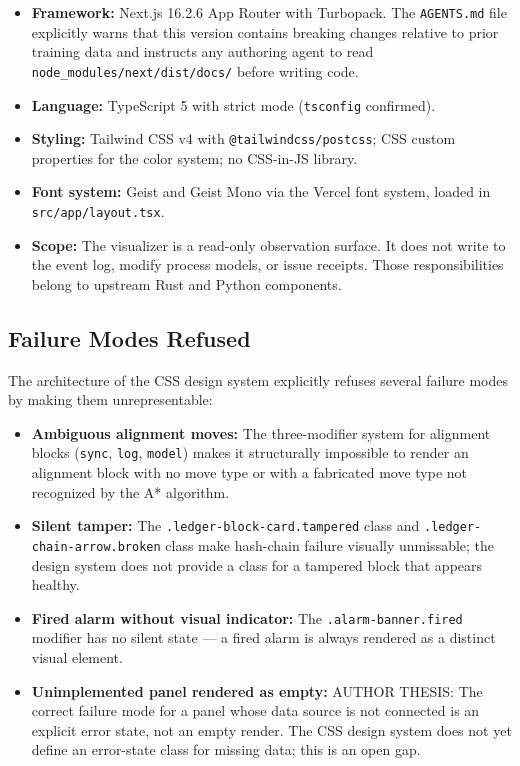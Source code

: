 \begin{itemize}
  \item \textbf{Framework:} Next.js 16.2.6 App Router with Turbopack. The \texttt{AGENTS.md}
        file explicitly warns that this version contains breaking changes relative to prior
        training data and instructs any authoring agent to read
        \texttt{node\_modules/next/dist/docs/} before writing code.
  \item \textbf{Language:} TypeScript 5 with strict mode (\texttt{tsconfig} confirmed).
  \item \textbf{Styling:} Tailwind CSS v4 with \texttt{@tailwindcss/postcss}; CSS custom
        properties for the color system; no CSS-in-JS library.
  \item \textbf{Font system:} Geist and Geist Mono via the Vercel font system, loaded in
        \texttt{src/app/layout.tsx}.
  \item \textbf{Scope:} The visualizer is a read-only observation surface. It does not write
        to the event log, modify process models, or issue receipts. Those responsibilities
        belong to upstream Rust and Python components.
\end{itemize}

\subsection{Failure Modes Refused}
\label{sec:experiments-visualizer-nextjs-arch-failures}

The architecture of the CSS design system explicitly refuses several failure modes by making
them unrepresentable:

\begin{itemize}
  \item \textbf{Ambiguous alignment moves:} The three-modifier system for alignment blocks
        (\texttt{sync}, \texttt{log}, \texttt{model}) makes it structurally impossible to
        render an alignment block with no move type or with a fabricated move type not
        recognized by the A{*} algorithm.
  \item \textbf{Silent tamper:} The \texttt{.ledger-block-card.tampered} class and
        \texttt{.ledger-chain-arrow.broken} class make hash-chain failure visually
        unmissable; the design system does not provide a class for a tampered block that
        appears healthy.
  \item \textbf{Fired alarm without visual indicator:} The \texttt{.alarm-banner.fired}
        modifier has no silent state --- a fired alarm is always rendered as a distinct
        visual element.
  \item \textbf{Unimplemented panel rendered as empty:} AUTHOR THESIS: The correct failure
        mode for a panel whose data source is not connected is an explicit error state, not
        an empty render. The CSS design system does not yet define an error-state class
        for missing data; this is an open gap.
\end{itemize}
